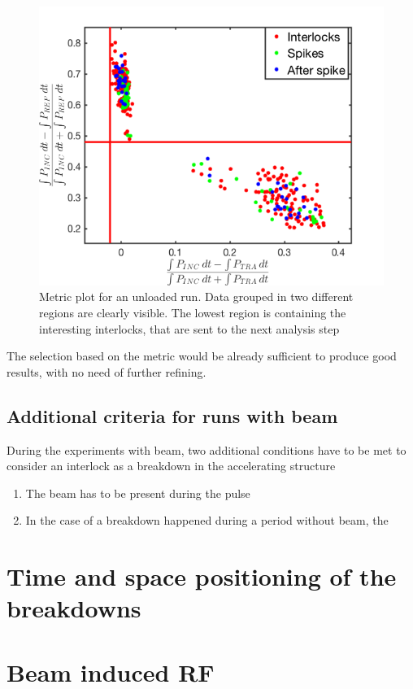 \begin{figure}[h]
\centering 
\includegraphics[scale=0.6]{pictures/metric_plt.png}
\caption{Metric plot for an unloaded run. Data grouped in two different regions are clearly visible. The lowest region is containing the interesting interlocks, that are sent to the next analysis step}
\label{Metric_plot}
\end{figure}


The selection based on the metric would be already sufficient to produce good results, with no need of further refining.



\subsection[Additional criteria for runs with beam]{Additional criteria for runs with beam}

During the experiments with beam, two additional conditions have to be met to consider an interlock as a breakdown in the accelerating structure
\begin{enumerate}
\item The beam has to be present during the pulse
\item In the case of a breakdown happened during a period without beam, the 
\end{enumerate}











\section[Time and space positioning of the breakdowns]{Time and space positioning of the breakdowns}







\section[Beam induced RF]{Beam induced RF}
